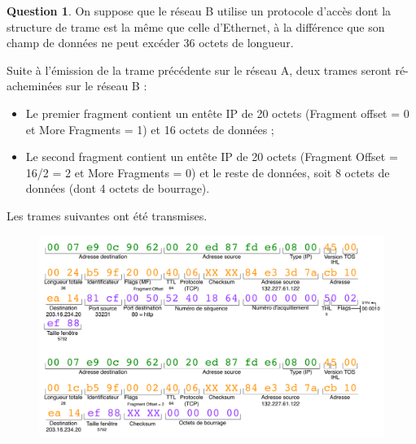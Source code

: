 \documentclass[11pt,english,french]{scrreprt}
\theoremstyle{remark}
\theoremstyle{definition}
\newtheorem{ques}{Question}[section]
\begin{document}
\begin{ques}
	On suppose que le réseau B utilise un protocole d'accès dont la structure de trame est la même que celle d'Ethernet, à la différence que son champ de données ne peut excéder 36 octets de longueur.
	
	Suite à l'émission de la trame précédente sur le réseau A, deux trames seront ré-acheminées sur le réseau B :\begin{itemize}
		\item Le premier fragment contient un entête IP de 20 octets (Fragment offset = 0 et More Fragments = 1) et 16 octets de données ;
		\item Le second fragment contient un entête IP de 20 octets (Fragment Offset = 16/2 = 2 et More Fragments = 0) et le reste de données, soit 8 octets de données (dont 4 octets de bourrage). 
	\end{itemize}
	
	Les trames suivantes ont été transmises.
	\begin{figure}[h]
		\center
		\includegraphics[scale=.7]{Exam2009/trame34}
	\end{figure}
\end{ques}
\end{document}
